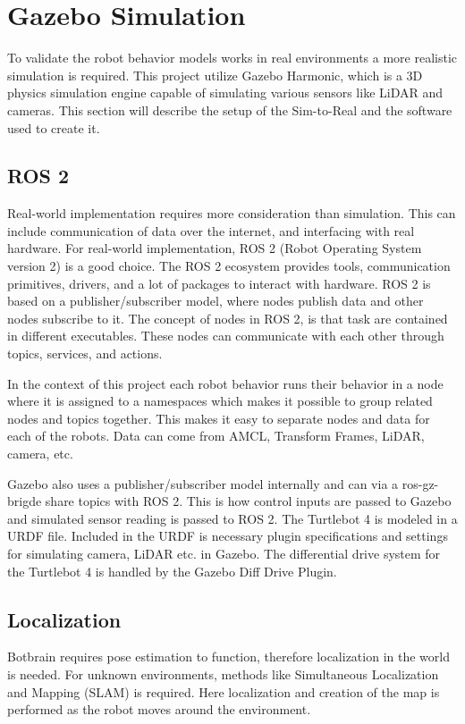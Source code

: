 \section{Gazebo Simulation}
To validate the robot behavior models works in real environments a more realistic simulation is required.
This project utilize Gazebo Harmonic, which is a 3D physics simulation engine capable of simulating various sensors like LiDAR and cameras.
This section will describe the setup of the {\color{red}Sim-to-Real} and the software used to create it.

\subsection{ROS 2}\label{sub:ros_2}
Real-world implementation requires more consideration than simulation. This can include communication of data over the internet, and interfacing with real hardware.
For real-world implementation, ROS 2 (Robot Operating System version 2) is a good choice. The ROS 2 ecosystem provides tools, communication primitives, drivers, and a lot of packages to interact with hardware. ROS 2 is based on a publisher/subscriber model, where nodes publish data and other nodes subscribe to it.
The concept of nodes in ROS 2, is that task are contained in different executables. These nodes can communicate with each other through topics, services, and actions.

In the context of this project each robot behavior runs their behavior in a node where it is assigned to a namespaces which makes it possible to group related nodes and topics together. 
This makes it easy to separate nodes and data for each of the robots. Data can come from AMCL, Transform Frames, LiDAR, camera, etc.

Gazebo also uses a publisher/subscriber model internally and can via a ros-gz-brigde share topics with ROS 2. This is how control inputs are passed to Gazebo and simulated sensor reading is passed to ROS 2.
The Turtlebot 4 is modeled in a URDF file. Included in the URDF is necessary plugin specifications and settings for simulating camera, LiDAR etc. in Gazebo. The differential drive system for the Turtlebot 4 is handled by the Gazebo Diff Drive Plugin.

\subsection{Localization}\label{sub:localization} 
Botbrain requires pose estimation to function, therefore localization in the world is needed.
For unknown environments, methods like Simultaneous Localization and Mapping (SLAM) is required. Here localization and creation of the map is performed
as the robot moves around the environment.

